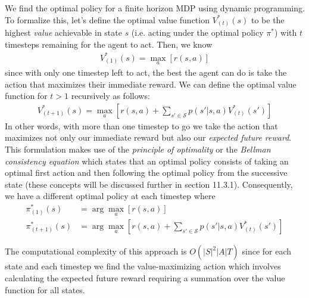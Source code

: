 We find the optimal policy for a finite horizon MDP using dynamic programming. To formalize this, let's define the optimal value function $V_{(t)}^*(s)$ to be the highest \textit{value} achievable in state $s$ (i.e. acting under the optimal policy $\pi^*$) with $t$ timesteps remaining for the agent to act. Then, we know
\begin{align*}
V_{(1)}^*(s) = \max_a [r(s, a)]
\end{align*}
since with only one timestep left to act, the best the agent can do is take the action that maximizes their immediate reward. We can define the optimal value function for $t > 1$ recursively as follows:
\begin{align*}
V_{(t + 1)}^*(s) = \max_a [r(s, a) + \sum_{s' \in \mathcal{S}}p(s'|s, a)V_{(t)}^*(s')]
\end{align*}
In other words, with more than one timestep to go we take the action that maximizes not only our immediate reward but also our \textit{expected future reward}. This formulation makes use of the \textit{principle of optimality} or the \textit{Bellman consistency equation} which states that an optimal policy consists of taking an optimal first action and then following the optimal policy from the successive state (these concepts will be discussed further in section 11.3.1). Consequently, we have a different optimal policy at each timestep where
\begin{align*}
\pi_{(1)}^*(s) &= \arg\max_a [r(s, a)]\\
\pi_{(t + 1)}^*(s) &= \arg\max_a [r(s, a) + \sum_{s' \in \mathcal{S}}p(s'|s, a)V_{(t)}^*(s')]
\end{align*}

The computational complexity of this approach is $O(|S|^2|A|T)$ since for each state and each timestep we find the value-maximizing action which involves calculating the expected future reward requiring a summation over the value function for all states.



